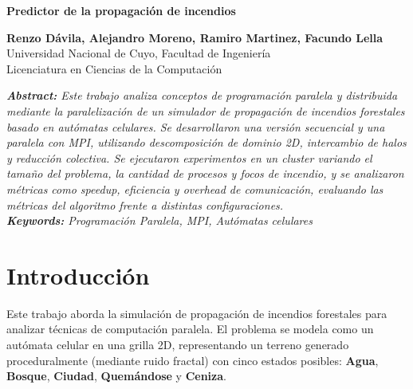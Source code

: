 \documentclass[10pt,a4paper]{article}
\begin{document}
\begin{center}
    \textbf{\fontsize{16}{19}\selectfont Predictor de la propagación de incendios}
\end{center}
\vspace{0.5cm}

\begin{center}
    \textbf{\fontsize{12}{15}\selectfont Renzo Dávila, Alejandro Moreno, Ramiro Martinez, Facundo Lella} \\
    \fontsize{10}{12}\selectfont Universidad Nacional de Cuyo, Facultad de Ingeniería \\
    Licenciatura en Ciencias de la Computación
\end{center}
\vspace{0.5cm}

\noindent \textit{\textbf{Abstract:} Este trabajo analiza conceptos de programación paralela y distribuida mediante la paralelización de un simulador de propagación de incendios forestales basado en autómatas celulares. Se desarrollaron una versión secuencial y una paralela con MPI, utilizando descomposición de dominio 2D, intercambio de halos y reducción colectiva. Se ejecutaron experimentos en un cluster variando el tamaño del problema, la cantidad de procesos y focos de incendio, y se analizaron métricas como speedup, eficiencia y overhead de comunicación, evaluando las métricas del algoritmo frente a distintas configuraciones.} \\

\vspace{0.2cm}
\noindent \textit{\textbf{Keywords:} Programación Paralela, MPI, Autómatas celulares}
\vspace{0.5cm}

\section{Introducción}
Este trabajo aborda la simulación de propagación de incendios forestales para analizar técnicas de computación paralela. El problema se modela como un autómata celular en una grilla 2D, representando un terreno generado proceduralmente (mediante ruido fractal) con cinco estados posibles: \textbf{Agua}, \textbf{Bosque}, \textbf{Ciudad}, \textbf{Quemándose} y \textbf{Ceniza}.
\end{document}
